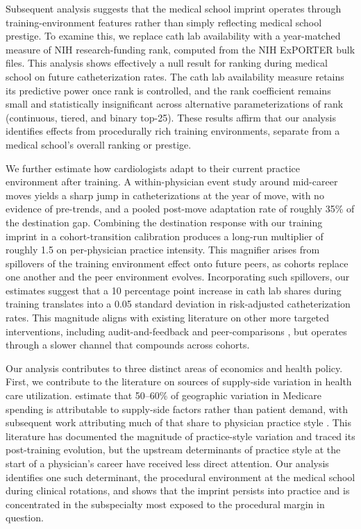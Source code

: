 \documentclass[12pt]{article}
\let\textcite\citet
\begin{document}
Subsequent analysis suggests that the medical school imprint operates through training-environment features rather than simply reflecting medical school prestige. To examine this, we replace cath lab availability with a year-matched measure of NIH research-funding rank, computed from the NIH ExPORTER bulk files. This analysis shows effectively a null result for ranking during medical school on future catheterization rates. The cath lab availability measure retains its predictive power once rank is controlled, and the rank coefficient remains small and statistically insignificant across alternative parameterizations of rank (continuous, tiered, and binary top-25). These results affirm that our analysis identifies effects from procedurally rich training environments, separate from a medical school's overall ranking or prestige.

We further estimate how cardiologists adapt to their current practice environment after training. A within-physician event study around mid-career moves yields a sharp jump in catheterizations at the year of move, with no evidence of pre-trends, and a pooled post-move adaptation rate of roughly 35\% of the destination gap. Combining the destination response with our training imprint in a cohort-transition calibration produces a long-run multiplier of roughly 1.5 on per-physician practice intensity. This magnifier arises from spillovers of the training environment effect onto future peers, as cohorts replace one another and the peer environment evolves. Incorporating such spillovers, our estimates suggest that a 10 percentage point increase in cath lab shares during training translates into a 0.05 standard deviation in risk-adjusted catheterization rates. This magnitude aligns with existing literature on other more targeted interventions, including audit-and-feedback and peer-comparisons \citep{ivers2012, doctor2018, barnett2023}, but operates through a slower channel that compounds across cohorts.

Our analysis contributes to three distinct areas of economics and health policy. First, we contribute to the literature on sources of supply-side variation in health care utilization. \textcite{finkelstein2016} estimate that 50--60\% of geographic variation in Medicare spending is attributable to supply-side factors rather than patient demand, with subsequent work attributing much of that share to physician practice style \citep{molitor2018, cutler2019, badinski2023}. This literature has documented the magnitude of practice-style variation and traced its post-training evolution, but the upstream determinants of practice style at the start of a physician's career have received less direct attention. Our analysis identifies one such determinant, the procedural environment at the medical school during clinical rotations, and shows that the imprint persists into practice and is concentrated in the subspecialty most exposed to the procedural margin in question.
\end{document}
